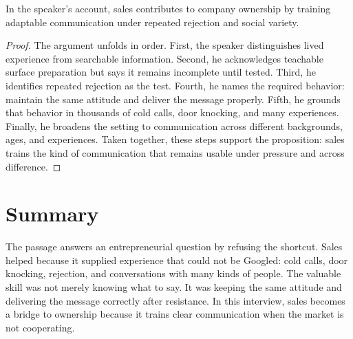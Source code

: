 \begin{proposition}
In the speaker's account, sales contributes to company ownership by training adaptable communication under repeated rejection and social variety.
\end{proposition}

\begin{proof}
The argument unfolds in order. First, the speaker distinguishes lived experience from searchable information. Second, he acknowledges teachable surface preparation but says it remains incomplete until tested. Third, he identifies repeated rejection as the test. Fourth, he names the required behavior: maintain the same attitude and deliver the message properly. Fifth, he grounds that behavior in thousands of cold calls, door knocking, and many experiences. Finally, he broadens the setting to communication across different backgrounds, ages, and experiences. Taken together, these steps support the proposition: sales trains the kind of communication that remains usable under pressure and across difference.
\end{proof}

\section{Summary}

The passage answers an entrepreneurial question by refusing the shortcut. Sales helped because it supplied experience that could not be Googled: cold calls, door knocking, rejection, and conversations with many kinds of people. The valuable skill was not merely knowing what to say. It was keeping the same attitude and delivering the message correctly after resistance. In this interview, sales becomes a bridge to ownership because it trains clear communication when the market is not cooperating.